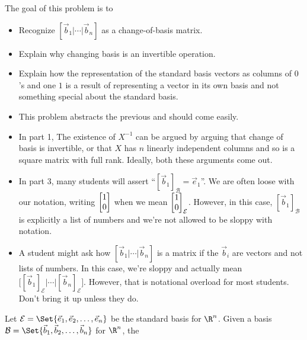 \documentclass{problemset}
\begin{document}
	\begin{annotation}
		\begin{goals}

			The goal of this problem is to
			\begin{itemize}
				\item Recognize $[\vec b_1|\cdots|\vec b_n]$ as a change-of-basis matrix.
				\item Explain why changing basis is an invertible operation.
				\item Explain how the representation of the standard basis vectors as columns
					of $0$'s and one $1$ is a result of representing a vector in its own
					basis and not something special about the standard basis.
			\end{itemize}
		\end{goals}

		\begin{notes}
			\begin{itemize}
				\item This problem abstracts the previous and should come easily.
				\item In part 1, The existence of $X^{-1}$ can be argued by arguing that change of basis
					is invertible, or that $X$ has $n$ linearly independent columns and
					so is a square matrix with full rank. Ideally, both these arguments come out.
				\item In part 3, many students will assert ``$[\vec b_1]_{\mathcal B}=\vec e_1$''.
					We are often loose with our notation, writing $\mat{1\\0}$
					when we mean $\mat{1\\0}_{\mathcal E}$. However, in this case,
					$[\vec b_1]_{\mathcal B}$ is explicitly a list of numbers and we're
					not allowed to be sloppy with notation.
				\item A student might ask how $[\vec b_1|\cdots|\vec b_n]$ is a matrix if the $\vec b_i$
					are vectors and not lists of numbers. In this case, we're sloppy and actually
					mean $\Big[[\vec b_1]_{\mathcal E}|\cdots|[\vec b_n]_{\mathcal E}\Big]$. However, that is
					notational overload for most students. Don't bring it up unless they do.
			\end{itemize}
		\end{notes}
	\end{annotation}
	Let $\mathcal E=\Set{\vec e_1,\vec e_2,\ldots,\vec e_n}$ be the standard basis for $\R^n$.
	Given a basis $\mathcal B=\Set{\vec b_1,\vec b_2,\ldots,\vec b_n}$ for $\R^n$, the
\end{document}
